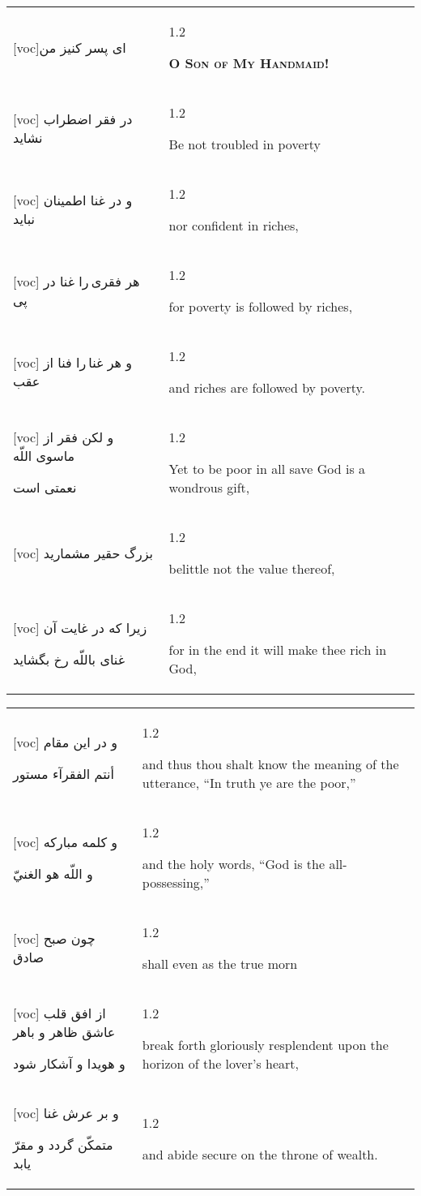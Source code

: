 \documentclass[11pt]{article}
\makeatletter
\newenvironment{orig}
  {\begin{farsi}[voc]}
  {\end{farsi}}
\newenvironment{trans}
  {\Large\begin{spacing}{1.2}\raggedright}
  {\end{spacing}}
\newenvironment{word}
  {\begin{tabular}[t]{p{2.75in}@{\hspace{3em}}p{2.75in}}}
  {\end{tabular}}
\newcommand{\ayat}[2]{\begin{orig}#1\end{orig} & \begin{trans}#2\end{trans}}
\newcommand{\heading}[2]{\textsc{\textbf{#1}} %
}
\makeatother
\begin{document}
\pagebreak

\begin{word}
\ayat{ای پسر کنيز من}{\heading{O Son of My Handmaid!}{}} \\ \ayat{
در فقر اضطراب نشايد
}{Be not troubled in poverty} \vspace{-1ex}\\ \ayat{
و در غنا اطمينان نبايد
}{nor confident in riches,} \vspace{-1ex}\\ \ayat{
هر فقری را غنا در پی
}{for poverty is followed by riches,} \vspace{-1ex}\\ \ayat{
و هر غنا را فنا از عقب
}{and riches are followed by poverty.} \vspace{-1ex}\\ \ayat{
و لکن فقر از ماسوی اللّه

نعمتی است
}{Yet to be poor in all save God is a wondrous gift,} \vspace{-1ex}\\ \ayat{
بزرگ حقير مشماريد
}{belittle not the value thereof,} \vspace{-1ex}\\ \ayat{
زيرا که در غايت آن

غنای باللّه رخ بگشايد
}{for in the end it will make thee rich in God,}
\end{word}

\pagebreak

\begin{word}
\ayat{
و در اين مقام

أنتم الفقرآء مستور
}{and thus thou shalt know the meaning of the utterance, ``In truth ye are the
  poor,''} \vspace{-1ex}\\ \ayat{
و کلمه مبارکه

و اللّه هو الغنيّ
}{and the holy words, ``God is the all-possessing,''} \\ \ayat{
چون صبح صادق
}{shall even as the true morn} \vspace{-1ex}\\ \ayat{
از افق قلب عاشق ظاهر و باهر

و هويدا و آشکار شود
}{break forth gloriously resplendent upon the horizon of the lover's
  heart,} \\ \ayat{
و بر عرش غنا

متمکّن گردد و مقرّ يابد
}{and abide secure on the throne of wealth.}
\end{word}

\pagebreak
\end{document}
